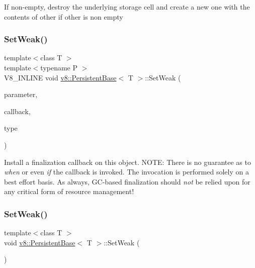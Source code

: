 If non-\/empty, destroy the underlying storage cell and create a new one with the contents of other if other is non empty \mbox{\label{classv8_1_1PersistentBase_aebb8a2c97e219102f613ff3749c956f6}} 
\subsubsection{\texorpdfstring{Set\+Weak()}{SetWeak()}\hspace{0.1cm}{\footnotesize\ttfamily [1/2]}}
{\footnotesize\ttfamily template$<$class T $>$ \\
template$<$typename P $>$ \\
V8\+\_\+\+I\+N\+L\+I\+NE void \mbox{\hyperlink{classv8_1_1PersistentBase}{v8\+::\+Persistent\+Base}}$<$ T $>$\+::Set\+Weak (\begin{DoxyParamCaption}\item[{P $\ast$}]{parameter,  }\item[{typename \mbox{\hyperlink{classv8_1_1WeakCallbackInfo}{Weak\+Callback\+Info}}$<$ P $>$\+::Callback}]{callback,  }\item[{Weak\+Callback\+Type}]{type }\end{DoxyParamCaption})}

Install a finalization callback on this object. N\+O\+TE\+: There is no guarantee as to {\itshape when} or even {\itshape if} the callback is invoked. The invocation is performed solely on a best effort basis. As always, G\+C-\/based finalization should {\itshape not} be relied upon for any critical form of resource management! \mbox{\label{classv8_1_1PersistentBase_a09fd1d1c3cd3ff32b91937f4d8beb1ea}} 
\subsubsection{\texorpdfstring{Set\+Weak()}{SetWeak()}\hspace{0.1cm}{\footnotesize\ttfamily [2/2]}}
{\footnotesize\ttfamily template$<$class T $>$ \\
void \mbox{\hyperlink{classv8_1_1PersistentBase}{v8\+::\+Persistent\+Base}}$<$ T $>$\+::Set\+Weak (\begin{DoxyParamCaption}{ }\end{DoxyParamCaption})}

